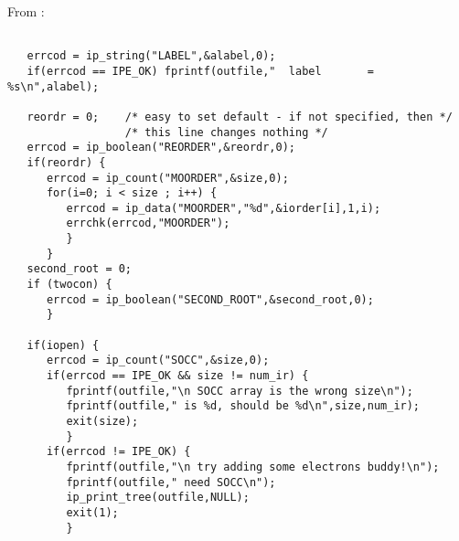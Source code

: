 From :
\begin{verbatim}

   errcod = ip_string("LABEL",&alabel,0);
   if(errcod == IPE_OK) fprintf(outfile,"  label       = %s\n",alabel);

   reordr = 0;    /* easy to set default - if not specified, then */
                  /* this line changes nothing */
   errcod = ip_boolean("REORDER",&reordr,0); 
   if(reordr) {
      errcod = ip_count("MOORDER",&size,0);
      for(i=0; i < size ; i++) {
         errcod = ip_data("MOORDER","%d",&iorder[i],1,i);
         errchk(errcod,"MOORDER");
         }
      }
   second_root = 0;
   if (twocon) {
      errcod = ip_boolean("SECOND_ROOT",&second_root,0);
      }

   if(iopen) {
      errcod = ip_count("SOCC",&size,0);
      if(errcod == IPE_OK && size != num_ir) {
         fprintf(outfile,"\n SOCC array is the wrong size\n");
         fprintf(outfile," is %d, should be %d\n",size,num_ir);
         exit(size);
         }
      if(errcod != IPE_OK) {
         fprintf(outfile,"\n try adding some electrons buddy!\n");
         fprintf(outfile," need SOCC\n");
         ip_print_tree(outfile,NULL);
         exit(1);
         }
\end{verbatim}

